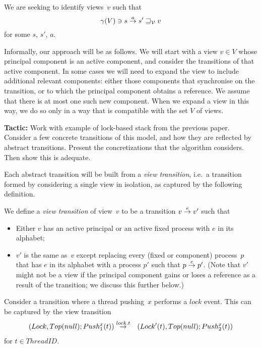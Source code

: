 We are seeking to identify views~$v$ such that
\[
\gamma(V) \ni s \stackrel{a}\rightarrow s' \sqsupseteq_{\mathcal{V}} v
\]
for some $s$, $s'$, $a$.

Informally, our approach will be as follows.  We will start with a view $v \in
V$ whose principal component is an active component, and consider the
transitions of that active component.  In some cases we will need to expand
the view to include additional relevant components: either those components
that synchronise on the transition, or to which the principal component
obtains a reference.  We assume that there is at most one such new component.
When we expand a
view in this way, we do so only in a way that is compatible with the set $V$
of views.



\textbf{Tactic:} Work with example of lock-based stack from the previous
paper.  Consider a few concrete transitions of this model, and how they are
reflected by abstract transitions.  Present the concretizations that the
algorithm considers.  Then show this is adequate.

Each abstract transition will be built from a \emph{view transition}, i.e.~a
transition formed by considering a single view in isolation, as captured by
the following definition.
%
\begin{definition}
We define a \emph{view transition} of view~$v$ to be a transition $v \stackrel{e}\rightarrow
v'$ such that
%
\begin{itemize}
\item Either $v$ has an active principal or an active fixed process with $e$
  in its alphabet;

\item $v'$ is the same as~$v$ except replacing every (fixed or component)
  process~$p$ that has $e$ in its alphabet with a process $p'$ such that $p
  \stackrel{e}\rightarrow p'$.  (Note that $v'$ might not be a view if the principal
  component gains or loses a reference as a result of the transition; we
  discuss this further below.)
\end{itemize}
\end{definition}

Consider a transition where a thread pushing~$x$ performs a $lock$ event.
This can be captured by the view transition
%
\begin{eqnarray}
(Lock, Top(null); Push^x_1(t)) & \stackrel{lock.t}\rightarrow & 
  (Lock'(t), Top(null); Push^x_2(t))
\label{trans:lock}
\end{eqnarray}
%
for $t \in ThreadID$.  

